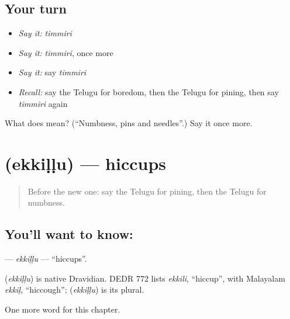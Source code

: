 \subsection*{Your turn}
\begin{itemize}
\raggedright
  \item \emph{Say it:} \emph{timmiri}
  \item \emph{Say it:} \emph{timmiri}, once more
  \item \emph{Say it:} say \emph{timmiri}
  \item \emph{Recall:} say the Telugu for boredom, then the Telugu for pining, then say \emph{timmiri} again
\end{itemize}

\begin{tcolorbox}[breakable,colback=teal!4,colframe=teal!35!black,title={Before you move on}]
What does  mean? (\textquotedblleft{}Numbness, pins and needles\textquotedblright{}.) Say it once more.
\end{tcolorbox}
\section[\texorpdfstring{\te{ఎక్కిళ్ళు} (ekkiḷḷu)}{ఎక్కిళ్ళు (ekkiḷḷu)}]{ (ekkiḷḷu) — hiccups}

\label{lesson:TE-C211-ekkillu}



\begin{quote}
Before the new one: say the Telugu for pining, then the Telugu for numbness.
\end{quote}

\subsection*{You'll want to know: }
\textbf{} — \emph{ekkiḷḷu} — \textquotedblleft{}hiccups\textquotedblright{}.

\begin{cousinweb}
\textbf{} (\emph{ekkiḷḷu}) is native Dravidian. DEDR 772 lists \emph{ekkili}, \textquotedblleft{}hiccup\textquotedblright{}, with Malayalam \emph{ekkiḷ}, \textquotedblleft{}hiccough\textquotedblright{}; \textbf{} (\emph{ekkiḷḷu}) is its plural.
\end{cousinweb}

\begin{grammarlens}[title={What you've built}]
One more word for this chapter.
\end{grammarlens}

